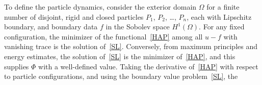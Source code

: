 %
%
%
To define the particle dynamics, consider the exterior domain $\Omega$
for a finite number of disjoint, rigid and closed particles $P_1$,
$P_2$, \ldots, $P_n$, each with Lipschitz boundary, and boundary data
$f$ in the Sobolev space $H^1(\Omega)$. For any fixed configuration, the
minimizer of the functional~\eqref{HAP} among all $u - f$ with vanishing
trace is the solution of~\eqref{SL}. Conversely, from maximum principles
and energy estimates, the solution of~\eqref{SL} is the minimizer
of~\eqref{HAP}, and this supplies $\Phi$ with a well-defined value.
Taking the derivative of~\eqref{HAP} with respect to particle
configurations, and using the boundary value problem~\eqref{SL}, the
